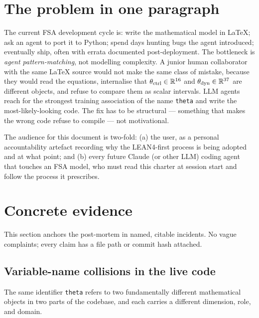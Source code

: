 \documentclass[11pt,a4paper]{article}
\begin{document}
\section{The problem in one paragraph}
\label{sec:problem-lean4}

The current FSA development cycle is: write the mathematical model
in LaTeX; ask an agent to port it to Python; spend days hunting bugs
the agent introduced; eventually ship, often with errata documented
post-deployment. The bottleneck is \emph{agent pattern-matching}, not
modelling complexity. A junior human collaborator with the same LaTeX
source would not make the same class of mistake, because they would
read the equations, internalise that $\theta_{\rm ctrl} \in
\mathbb{R}^{16}$ and $\theta_{\rm dyn} \in \mathbb{R}^{37}$ are
different objects, and refuse to compare them as scalar intervals.
LLM agents reach for the strongest training association of the name
\texttt{theta} and write the most-likely-looking code. The fix has
to be structural --- something that makes the wrong code refuse to
compile --- not motivational.

The audience for this document is two-fold: (a) the user, as a
personal accountability artefact recording why the LEAN4-first
process is being adopted and at what point; and (b) every future
Claude (or other LLM) coding agent that touches an FSA model, who
must read this charter at session start and follow the process it
prescribes.

\section{Concrete evidence}
\label{sec:evidence}

This section anchors the post-mortem in named, citable incidents.
No vague complaints; every claim has a file path or commit hash
attached.

\subsection{Variable-name collisions in the live code}
\label{sec:evidence-collisions}

The same identifier \texttt{theta} refers to two fundamentally
different mathematical objects in two parts of the codebase, and
each carries a different dimension, role, and domain.
\end{document}

